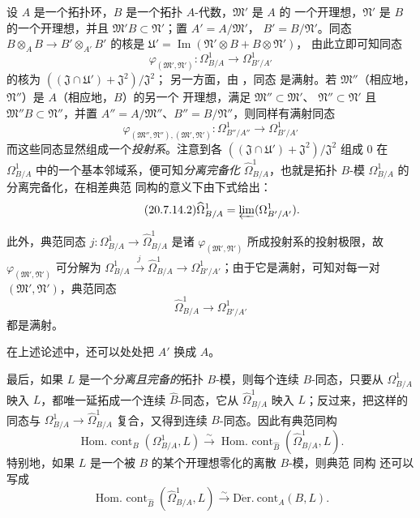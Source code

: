 \begin{env}[20.7.14]
\label{0.20.7.14-fr}
设 $A$ 是一个拓扑环，$B$ 是一个拓扑 $A$-代数，$\mathfrak{M}'$ 是 $A$ 的
一个开理想，$\mathfrak{N}'$ 是 $B$ 的一个开理想，并且
$\mathfrak{M}'B\subset\mathfrak{N}'$；置 $A'=A/\mathfrak{M}'$，
$B'=B/\mathfrak{N}'$。同态 $B\otimes_A B\to B'\otimes_{A'}B'$ 的核是
$\mathfrak{U}'=\operatorname{Im}(\mathfrak{N}'\otimes B+B\otimes\mathfrak{N}')$，
由此立即可知同态
\begin{equation}
\tag{20.7.14.1}
\label{0.20.7.14.1-fr}
  \varphi_{(\mathfrak{M}',\mathfrak{N}')}:
  \Omega^1_{B/A}\to\Omega^1_{B'/A'}
\end{equation}
的核为 $((\mathfrak{J}\cap\mathfrak{U}')+\mathfrak{J}^2)/\mathfrak{J}^2$；
另一方面，由 ，同态  是满射。若
$\mathfrak{M}''$（相应地，$\mathfrak{N}''$）是 $A$（相应地，$B$）的另一个
开理想，满足 $\mathfrak{M}''\subset\mathfrak{M}'$、
$\mathfrak{N}''\subset\mathfrak{N}'$ 且
$\mathfrak{M}''B\subset\mathfrak{N}''$，并置
$A''=A/\mathfrak{M}''$、$B''=B/\mathfrak{N}''$，则同样有满射同态
\[
  \varphi_{(\mathfrak{M}'',\mathfrak{N}''),(\mathfrak{M}',\mathfrak{N}')}:
  \Omega^1_{B''/A''}\to\Omega^1_{B'/A'}
\]
而这些同态显然组成一个\emph{投射系}。注意到各
$((\mathfrak{J}\cap\mathfrak{U}')+\mathfrak{J}^2)/\mathfrak{J}^2$ 组成
$0$ 在 $\Omega^1_{B/A}$ 中的一个基本邻域系，便可知\emph{分离完备化}
$\widehat{\Omega}^1_{B/A}$，也就是拓扑 $B$-模 $\Omega^1_{B/A}$ 的分离完备化，在相差典范
同构的意义下由下式给出：
\begin{equation}
\tag{20.7.14.2}
\label{0.20.7.14.2-fr}
  \widehat{\Omega}^1_{B/A}=\varprojlim(\Omega^1_{B'/A'}).
\end{equation}

此外，典范同态 $j:\Omega^1_{B/A}\to\widehat{\Omega}^1_{B/A}$ 是诸
$\varphi_{(\mathfrak{M}',\mathfrak{N}')}$ 所成投射系的投射极限，故
$\varphi_{(\mathfrak{M}',\mathfrak{N}')}$ 可分解为
$\Omega^1_{B/A}\xrightarrow{j}\widehat{\Omega}^1_{B/A}\to
\Omega^1_{B'/A'}$；由于它是满射，可知对每一对
$(\mathfrak{M}',\mathfrak{N}')$，典范同态
\begin{equation}
\tag{20.7.14.3}
\label{0.20.7.14.3-fr}
  \widehat{\Omega}^1_{B/A}\to\Omega^1_{B'/A'}
\end{equation}
都是满射。

在上述论述中，还可以处处把 $A'$ 换成 $A$。

最后，如果 $L$ 是一个\emph{分离且完备的}拓扑 $B$-模，则每个连续
$B$-同态，只要从 $\Omega^1_{B/A}$ 映入 $L$，都唯一延拓成一个连续
$\widehat B$-同态，它从 $\widehat{\Omega}^1_{B/A}$ 映入 $L$；反过来，把这样的
同态与 $\Omega^1_{B/A}\to\widehat{\Omega}^1_{B/A}$ 复合，又得到连续
$B$-同态。因此有典范同构
\[
  \operatorname{Hom.\ cont}_B(\Omega^1_{B/A},L)\xrightarrow{\sim}
  \operatorname{Hom.\ cont}_{\widehat B}(\widehat{\Omega}^1_{B/A},L).
\]
特别地，如果 $L$ 是一个被 $B$ 的某个开理想零化的离散 $B$-模，则典范
同构  还可以写成
\begin{equation}
\tag{20.7.14.4}
\label{0.20.7.14.4-fr}
  \operatorname{Hom.\ cont}_{\widehat B}(\widehat{\Omega}^1_{B/A},L)
  \xrightarrow{\sim}\operatorname{D\acute{e}r.\ cont}_A(B,L).
\end{equation}
\end{env}

